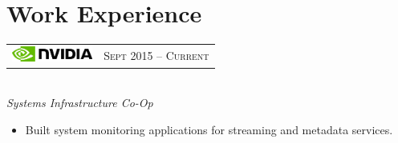 \documentclass[10pt]{article}
\begin{document}
\color{text1} %



\par{
\vspace{0.2cm}
	

\begin{minipage}[t]{0.5\textwidth} %
\vspace{0pt} %


\section{Work Experience} 


\begin{tabular}{ L{5cm} R{3.5cm} }
\includegraphics[height=0.5cm]{nvidia} & 
{\raggedleft\textsc{Sept 2015 -- Current}} \\
\end{tabular}
{\raggedright\large \\
\textit{Systems Infrastructure Co-Op}\\[5pt]}

\begin{itemize}
  \setlength\itemsep{0.4mm}
  \item[\ding{226}] Built system monitoring applications for streaming and metadata services.
\end{itemize}



\end{minipage}}
\end{document}
